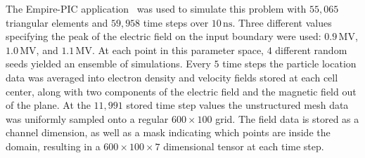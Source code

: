 \documentclass[12pt]{article}
\begin{document}
The Empire-PIC application~\cite{bettencourt2021empire} was used to simulate this problem with $55{,}065$ triangular elements and $59{,}958$ time steps over $10\, \mathrm{ns}$. Three different values specifying the peak of the electric field on the input boundary were used: $0.9\, \mathrm{MV}$, $1.0\, \mathrm{MV}$, and $1.1\, \mathrm{MV}$. At each point in this parameter space, $4$ different random seeds yielded an ensemble of simulations. Every $5$ time steps the particle location data was averaged into electron density and velocity fields stored at each cell center, along with two components of the electric field and the magnetic field out of the plane. At the $11{,}991$ stored time step values the unstructured mesh data was uniformly sampled onto a regular $600 \times 100$ grid. The field data is stored as a channel dimension, as well as a mask indicating which points are inside the domain, resulting in a $600\times 100 \times 7$ dimensional tensor at each time step.
\end{document}
